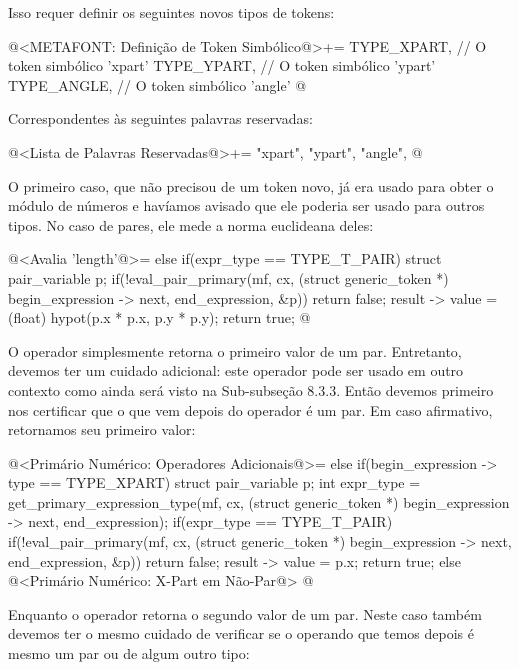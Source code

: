 Isso requer definir os seguintes novos tipos de tokens:

\iniciocodigo
@<METAFONT: Definição de Token Simbólico@>+=
TYPE_XPART,  // O token simbólico 'xpart'
TYPE_YPART,  // O token simbólico 'ypart'
TYPE_ANGLE,  // O token simbólico 'angle'
@
\fimcodigo

Correspondentes às seguintes palavras reservadas:

\iniciocodigo
@<Lista de Palavras Reservadas@>+=
"xpart", "ypart", "angle",
@
\fimcodigo

O primeiro caso, que não precisou de um token
novo,  já era usado para obter o módulo de números
e havíamos avisado que ele poderia ser usado para outros tipos. No
caso de pares, ele mede a norma euclideana deles:

\iniciocodigo
@<Avalia 'length'@>=
else if(expr_type == TYPE_T_PAIR){
  struct pair_variable p;
  if(!eval_pair_primary(mf, cx, (struct generic_token *)
                                begin_expression -> next, end_expression,
                                &p))
    return false;
  result -> value = (float) hypot(p.x * p.x, p.y * p.y);
  return true;
}
@
\fimcodigo

O operador  simplesmente retorna o primeiro valor de
um par. Entretanto, devemos ter um cuidado adicional: este operador
pode ser usado em outro contexto como ainda será visto na Sub-subseção
8.3.3. Então devemos primeiro nos certificar que o que vem depois do
operador é um par. Em caso afirmativo, retornamos seu primeiro valor:

\iniciocodigo
@<Primário Numérico: Operadores Adicionais@>=
else if(begin_expression -> type == TYPE_XPART){
  struct pair_variable p;
  int expr_type = get_primary_expression_type(mf, cx, (struct generic_token *)
                                                      begin_expression -> next,
                                                      end_expression);
  if(expr_type == TYPE_T_PAIR){
    if(!eval_pair_primary(mf, cx, (struct generic_token *)
                                  begin_expression -> next, end_expression,
                                  &p))
      return false;
    result -> value = p.x;
    return true;
  }
  else{
    @<Primário Numérico: X-Part em Não-Par@>
  }
}
@
\fimcodigo

Enquanto o operador  retorna o segundo valor de um
par. Neste caso também devemos ter o mesmo cuidado de verificar se o
operando que temos depois é mesmo um par ou de algum outro tipo:

